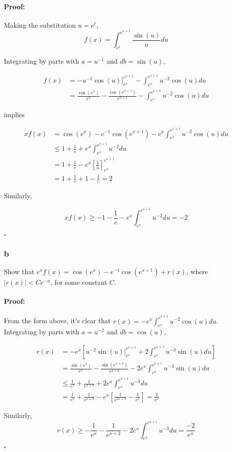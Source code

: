 \documentclass{article}
\newenvironment{proof}{\paragraph{Proof:}}{\hfill$\square$}
\begin{document}
\begin{proof}
Making the substitution $u = e^t$,
\[
f(x) = \int_{e^x}^{e^{x+1}} \frac{\sin(u)}{u}du
\]

Integrating by parts with $a = u^{-1}$ and $db = \sin(u)$,

\begin{align*}
f(x) &= -u^{-1}\cos(u)\Big]_{e^x}^{e^{x+1}} - \int_{e^x}^{e^{x+1}} u^{-2}\cos(u)du \\
&= \frac{\cos(e^x)}{e^x} - \frac{\cos(e^{x+1})}{e^{x+1}} - \int_{e^x}^{e^{x+1}} u^{-2}\cos(u)du
\end{align*}

implies

\begin{align*}
xf(x) &= \cos(e^x) - e^{-1}\cos(e^{x+1}) - e^x\int_{e^x}^{e^{x+1}} u^{-2}\cos(u)du \\
&\leq 1 + \frac{1}{e} + e^x\int_{e^x}^{e^{x+1}} u^{-2}du \\
&= 1 + \frac{1}{e} - e^x\left[\frac{1}{u}\right]_{e^x}^{e^{x+1}} \\
&= 1 + \frac{1}{e} + 1 - \frac{1}{e} = 2
\end{align*}

Similarly,

\[
xf(x) \geq -1 - \frac{1}{e} - e^x\int_{e^x}^{e^{x+1}} u^{-2}du = -2
\]

\end{proof}

\subsubsection*{b}

Show that $e^x f(x) = \cos(e^x) - e^{-1}\cos(e^{x+1}) + r(x)$, where $|r(x)| < Ce^{-x}$, for some constant $C$.

\begin{proof}
From the form above, it's clear that $r(x) = - e^x\int_{e^x}^{e^{x+1}} u^{-2}\cos(u)du$. Integrating by parts with $a = u^{-2}$ and $db = \cos(u)$,

\begin{align*}
r(x) &= -e^{x} \left[
u^{-2}\sin(u)\Big|_{e^x}^{e^{x+1}} + 2\int_{e^x}^{e^{x+1}} u^{-3}\sin(u)du \right] \\
&= \frac{\sin(e^x)}{e^x} - \frac{\sin(e^{x+1})}{e^{x+2}} - 2e^x\int_{e^x}^{e^{x+1}}u^{-3}\sin(u)du \\
&\leq \frac{1}{e^x} + \frac{1}{e^{x+2}} + 2e^x\int_{e^x}^{e^{x+1}}u^{-3}du \\
&= \frac{1}{e^x} + \frac{1}{e^{x+2}} -e^x\left[\frac{1}{e^{2x+2}} - \frac{1}{e^x}\right] = \frac{2}{e^x}
\end{align*}

Similarly,
\[
r(x) \geq -\frac{1}{e^x} - \frac{1}{e^{x+2}} - 2e^x\int_{e^x}^{e^{x+1}}u^{-3}du = \frac{-2}{e^x}
\]

\end{proof}
\end{document}
